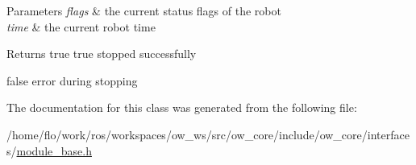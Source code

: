 \begin{DoxyParams}{Parameters}
{\em flags} & the current status flags of the robot \\
\hline
{\em time} & the current robot time \\
\hline
\end{DoxyParams}
\begin{DoxyReturn}{Returns}
true true stopped successfully 

false error during stopping 
\end{DoxyReturn}


The documentation for this class was generated from the following file\+:\begin{DoxyCompactItemize}
\item 
/home/flo/work/ros/workspaces/ow\+\_\+ws/src/ow\+\_\+core/include/ow\+\_\+core/interfaces/\hyperlink{module__base_8h}{module\+\_\+base.\+h}\end{DoxyCompactItemize}
